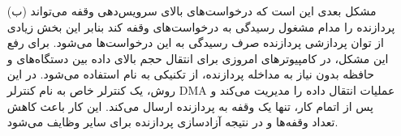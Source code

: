 \begin{enumerate}
\begin{qsolve}[]
\begin{enumerate}
		\end{enumerate}
	\end{qsolve}
	
	\begin{qsolve}
		\begin{enumerate}
			\item [(ب)]
			مشکل بعدی این است که درخواست‌های بالای سرویس‌دهی وقفه می‌تواند پردازنده را مدام مشغول رسیدگی به درخواست‌های وقفه کند بنابر این بخش زیادی از توان پردازشی پردازنده صرف رسیدگی به این درخواست‌ها می‌شود. برای رفع این مشکل، در کامپیوتر‌های امروزی برای انتقال حجم بالای داده بین دستگاه‌های  و حافظه بدون نیاز به مداخله پردازنده، از تکنیکی به نام  استفاده می‌شود. در این روش، یک کنترلر خاص به نام کنترلر DMA عملیات انتقال داده را مدیریت می‌کند و پس از اتمام کار، تنها یک وقفه به پردازنده ارسال می‌کند. این کار باعث کاهش تعداد وقفه‌ها و در نتیجه آزادسازی پردازنده برای سایر وظایف می‌شود.
		\end{enumerate}
	\end{qsolve}
\end{enumerate}



